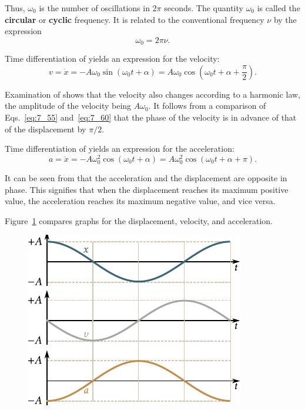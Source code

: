 \noindent
Thus, $\omega_0$ is the number of oscillations in $2\pi$ seconds. The quantity $\omega_0$ is called the \textbf{circular} or \textbf{cyclic} frequency. It is related to the conventional frequency $\nu$ by the expression
\begin{equation}\label{eq:7_59}
	\omega_0 = 2\pi\nu.
\end{equation}

Time differentiation of  yields an expression for the velocity:
\begin{equation}\label{eq:7_60}
	v = \dot{x} = -A\omega_0\sin(\omega_0 t + \alpha) = A\omega_0\cos\left(\omega_0 t + \alpha + \frac{\pi}{2}\right).
\end{equation}

\noindent
Examination of  shows that the velocity also changes according to a harmonic law, the amplitude of the velocity being $A\omega_0$. It follows from a comparison of Eqs.~\eqref{eq:7_55} and~\eqref{eq:7_60} that the phase of the velocity is in advance of that of the displacement
by $\pi/2$.

Time differentiation of  yields an expression for the acceleration:
\begin{equation}\label{eq:7_61}
	a = \ddot{x} = -A\omega_0^2\cos(\omega_0 t + \alpha) = A\omega_0^2\cos(\omega_0 t + \alpha + \pi).
\end{equation}

\noindent
It can be seen from  that the acceleration and the displacement are opposite in phase. This signifies that when the displacement reaches its maximum positive value, the acceleration reaches its maximum negative value, and vice versa.

Figure~\ref{fig:7_5} compares graphs for the displacement, velocity, and acceleration.

\begin{figure}[t]
	\begin{center}
		\includegraphics[scale=0.95]{figures/ch_07/fig_7_5.pdf}
		\caption[]{}
		\label{fig:7_5}
	\end{center}
	\vspace{-1.0cm}
\end{figure}

